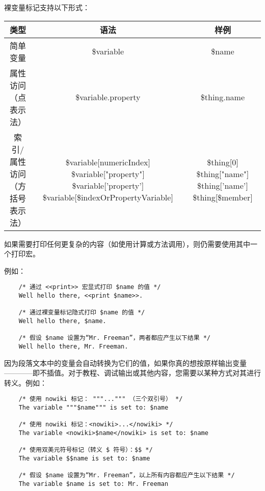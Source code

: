 \documentclass[hyperref,UTF8]{ctexart}
\begin{document}
裸变量标记支持以下形式：
\begin{center}
    \begin{tabular}{c|c|c}
        \textbf{类型} & \textbf{语法} & \textbf{样例} \\ \hline
        简单变量 & \$variable & \$name \\ \hline
        \makecell{属性访问 \\ （点表示法）} & \$variable.property & \$thing.name \\ \hline
        \makecell{索引/属性访问 \\ （方括号表示法）} & \makecell{\$variable[numericIndex] \\ \$variable["property"] \\ \$variable['property']  \\ \$variable[\$indexOrPropertyVariable]} & \makecell{\$thing[0] \\ \$thing["name"] \\ \$thing['name'] \\ \$thing[\$member]}
    \end{tabular}
\end{center}

如果需要打印任何更复杂的内容（如使用计算或方法调用），则仍需要使用其中一个打印宏。

例如：
\begin{lstlisting}
    /* 通过 <<print>> 宏显式打印 $name 的值 */
    Well hello there, <<print $name>>.
    
    /* 通过裸变量标记隐式打印 $name 的值 */
    Well hello there, $name.
    
    /* 假设 $name 设置为“Mr. Freeman”，两者都应产生以下结果 */
    Well hello there, Mr. Freeman.
\end{lstlisting}

因为段落文本中的变量会自动转换为它们的值，如果你真的想按原样输出变量————即不插值。对于教程、调试输出或其他内容，您需要以某种方式对其进行转义。例如：
\begin{lstlisting}
    /* 使用 nowiki 标记： """...""" （三个双引号） */
    The variable """$name""" is set to: $name
    
    /* 使用 nowiki 标记：<nowiki>...</nowiki> */
    The variable <nowiki>$name</nowiki> is set to: $name
    
    /* 使用双美元符号标记（转义 $ 符号）：$$ */
    The variable $$name is set to: $name
    
    /* 假设 $name 设置为“Mr. Freeman”，以上所有内容都应产生以下结果 */
    The variable $name is set to: Mr. Freeman
\end{lstlisting}
\end{document}
